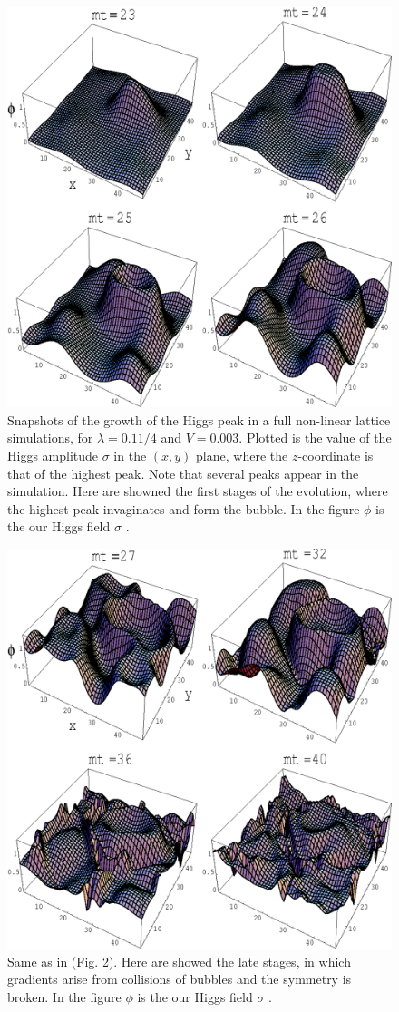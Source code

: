 \documentclass[11pt,a4paper,twoside]{book}
\begin{document}
\begin{figure}
	\centering
	\includegraphics[width=0.6\linewidth, height=0.4\textheight]{Images/Chap5/SymmetryBreaking_Fig7}
	\caption{Snapshots of the growth of the Higgs peak in a full non-linear lattice simulations, for $ \lambda=0.11/4 $ and $ V=0.003 $. Plotted is the value of the Higgs amplitude $\sigma$ in the $(x,y) $ plane, where the $ z $-coordinate is that of the highest peak. Note that several peaks appear in the simulation. Here are showned the first stages of the evolution, where the highest peak invaginates and form the bubble. In the figure $\phi$ is the our Higgs field $\sigma$ \cite{Chap5:FalseVacuumDecay}.}
	\label{fig:symmetrybreakingfig7}
\end{figure}
\begin{figure}
	\centering
	\includegraphics[width=0.6\linewidth, height=0.4\textheight]{Images/Chap5/SymmetryBreaking_Fig8}
	\caption{Same as in (Fig. \ref{fig:symmetrybreakingfig8}). Here are showed the late stages, in which gradients arise from collisions of bubbles and the symmetry is broken. In the figure $\phi$ is the our Higgs field $\sigma$ \cite{Chap5:FalseVacuumDecay}.}
	\label{fig:symmetrybreakingfig8}
\end{figure}
\end{document}
